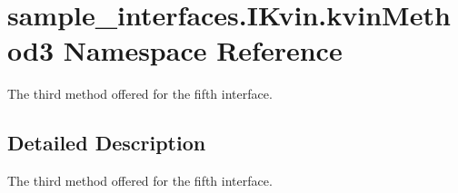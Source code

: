 \hypertarget{namespacesample__interfaces_1_1_i_kvin_1_1kvin_method3}{\section{sample\-\_\-interfaces.\-I\-Kvin.\-kvin\-Method3 Namespace Reference}
\label{namespacesample__interfaces_1_1_i_kvin_1_1kvin_method3}
}


The third method offered for the fifth interface.  




\subsection{Detailed Description}
The third method offered for the fifth interface. 